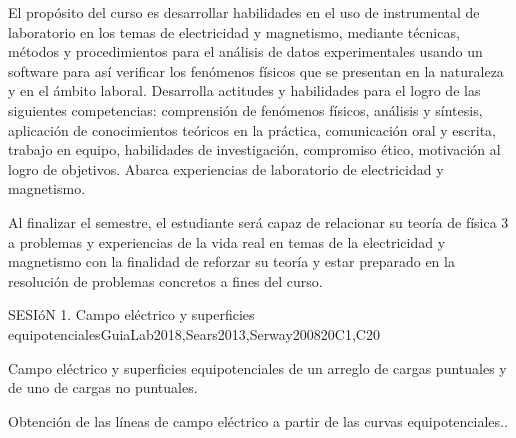 \begin{syllabus}


\begin{justification}
El propósito del curso es desarrollar habilidades en el uso de instrumental de laboratorio en los temas de electricidad y magnetismo, mediante técnicas, métodos y procedimientos para el análisis de datos experimentales usando un software para así verificar los fenómenos físicos que se presentan en la naturaleza y en el ámbito laboral. Desarrolla actitudes y habilidades para el logro de las siguientes competencias: comprensión de fenómenos físicos, análisis y síntesis, aplicación de conocimientos teóricos en la práctica, comunicación oral y escrita, trabajo en equipo, habilidades de investigación, compromiso ético, motivación al logro de objetivos. Abarca experiencias de laboratorio de electricidad y magnetismo. 
\end{justification}

\begin{goals}
\item Al finalizar el semestre, el estudiante será capaz de relacionar su teoría de física 3 a problemas y experiencias de la vida real en temas de la electricidad y magnetismo con la finalidad de reforzar su teoría y estar preparado en la resolución de problemas concretos a fines del curso.
\end{goals}

\begin{outcomes}
\item {}
\item {}
\end{outcomes}

\begin{competences}
    \item {}
\end{competences}

\begin{unit}{SESIóN 1. Campo eléctrico y superficies equipotenciales}{}{GuiaLab2018,Sears2013,Serway2008}{20}{C1,C20}
\begin{topics}
      \item Campo eléctrico y superficies equipotenciales de un arreglo de cargas puntuales y de uno de cargas no puntuales.
      \item Obtención de las líneas de campo eléctrico a partir de las curvas equipotenciales..
\end{topics}
\end{unit}


\end{syllabus}
